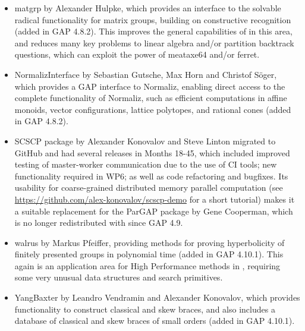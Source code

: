 \begin{itemize}
\item
{\sf matgrp}  by Alexander Hulpke, which provides an interface
to the solvable radical functionality for matrix groups, building on
constructive recognition (added in GAP 4.8.2). This improves the
general capabilities of \GAP in this area, and reduces many key
problems to linear algebra and/or partition backtrack questions, which
can exploit the power of {\sf meataxe64} and/or {\sf ferret}.

\item
{\sf NormalizInterface}  by Sebastian Gutsche, Max Horn and
Christof S\"oger, which provides a GAP interface to Normaliz, enabling
direct access to the complete functionality of Normaliz, such as efficient
computations in affine monoids, vector configurations, lattice
polytopes, and rational cones (added in GAP 4.8.2). 

\item
{\sf SCSCP} package \cite{SCSCP} by Alexander Konovalov
and Steve Linton migrated to GitHub and had several releases
in Months 18-45, which included improved testing of 
master-worker communication due to the use of
CI tools; new functionality required in WP6; as well as
code refactoring and bugfixes. Its usability for 
coarse-grained distributed memory parallel computation
(see \url{https://github.com/alex-konovalov/scscp-demo}
for a short tutorial) makes it a suitable replacement for the {\sf ParGAP}
package by Gene Cooperman, which is no longer redistributed 
with \GAP since GAP 4.9.

\item
{\sf walrus} by Markus Pfeiffer, providing methods for proving 
hyperbolicity of finitely presented groups in polynomial time
(added in GAP 4.10.1). This again is an application area for High
Performance methods in \GAP, requiring some very unusual data
structures and search primitives.

\item
{\sf YangBaxter} by Leandro Vendramin and Alexander Konovalov, 
which provides functionality to construct classical and 
skew braces, and also includes a database of classical 
and skew braces of small orders (added in GAP 4.10.1).

\end{itemize}

